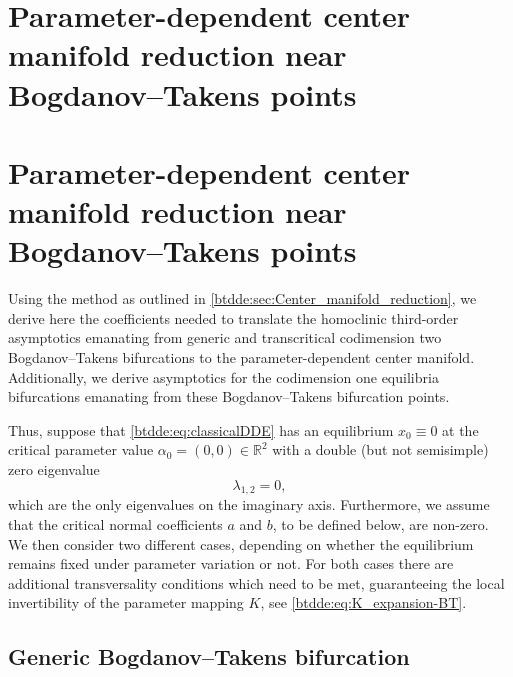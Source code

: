 % 

\ifarxiv
\section{Parameter-dependent center manifold reduction near Bog\-danov--Takens points}
\else
\section{Parameter-dependent center manifold reduction near Bogdanov--Takens points}
\fi
\label{btdde:sec:parameter-dependent-center-manifold-reduction} 
Using the method as outlined in \cref{btdde:sec:Center_manifold_reduction}, we derive
here the coefficients needed to translate the homoclinic third-order asymptotics
emanating from generic and transcritical codimension two Bogdanov--Takens
bifurcations to the parameter-dependent center manifold. Additionally, we derive
asymptotics for the codimension one equilibria bifurcations emanating from these
Bogdanov--Takens bifurcation points.

Thus, suppose that \cref{btdde:eq:classicalDDE} has an equilibrium $x_0 \equiv 0$ at
the critical parameter value $\alpha_0 = (0,0) \in \mathbb R^2$ with a double
(but not semisimple) zero eigenvalue
\begin{equation}
    \lambda_{1,2} = 0,
\end{equation}
which are the only eigenvalues on the imaginary axis. Furthermore, we assume
that the critical normal coefficients $a$ and $b$, to be defined below, are
non-zero. We then consider two different cases, depending on whether the
equilibrium remains fixed under parameter variation or not. For both cases there
are additional transversality conditions which need to be met, guaranteeing the
local invertibility of the parameter mapping $K$, see \cref{btdde:eq:K_expansion-BT}.

\subsection{Generic Bogdanov--Takens bifurcation}
\label{btdde:sec:generic_bogdanov-takens}

